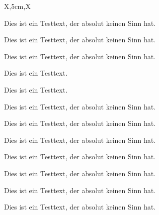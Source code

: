 \documentclass[a3paper,scifiposter,style=scifi]{tubsposter}
\begin{document}
\begin{tubsposter}[sender=bottom]{X,5cm,X}
  \begin{posterrow}
    Dies ist ein Testtext, der absolut keinen Sinn hat.
  \end{posterrow}
  \begin{posterrow}[X,4cm,X]
    \begin{postercol}[X,X]
      \begin{postersubrow}
        Dies ist ein Testtext, der absolut keinen Sinn hat.
      \end{postersubrow}
      \begin{postersubrow}
        Dies ist ein Testtext, der absolut keinen Sinn hat.
      \end{postersubrow}
    \end{postercol}
    \begin{postercol}[X,X]
      \begin{postersubrow}
        Dies ist ein Testtext.
      \end{postersubrow}
      \begin{postersubrow}
        Dies ist ein Testtext.
      \end{postersubrow}
    \end{postercol}
    \begin{postercol}
      Dies ist ein Testtext, der absolut keinen Sinn hat.
    \end{postercol}
  \end{posterrow}
  \begin{posterrow}[X,X,X,X]
    \begin{postercol}
      Dies ist ein Testtext, der absolut keinen Sinn hat.
    \end{postercol}
    \begin{postercol}[2cm,X,X]
      \begin{postersubrow}
        Dies ist ein Testtext, der absolut keinen Sinn hat.
      \end{postersubrow}
      \begin{postersubrow}
        Dies ist ein Testtext, der absolut keinen Sinn hat.
      \end{postersubrow}
      \begin{postersubrow}
        Dies ist ein Testtext, der absolut keinen Sinn hat.
      \end{postersubrow}
    \end{postercol}
    \begin{postercol}
      Dies ist ein Testtext, der absolut keinen Sinn hat.
    \end{postercol}
    \begin{postercol}
      Dies ist ein Testtext, der absolut keinen Sinn hat.
    \end{postercol}
  \end{posterrow}
\end{tubsposter}
\end{document}
